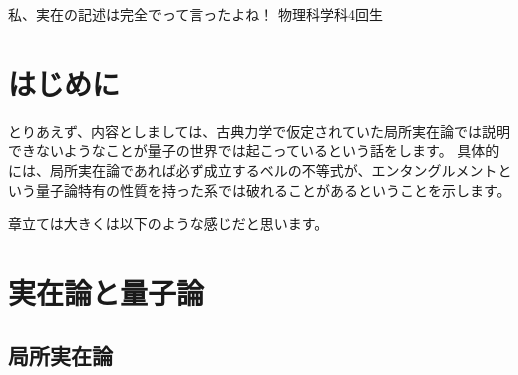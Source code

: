 \documentclass[10pt,b5paper,papersize,dvipdfmx]{jsbook}
\begin{document}

\newcommand\karizu[1]{\begin{center}（図：#1）\end{center}}
\renewcommand\textcolor[2]{#2}

\newif\ifsecI
\newif\ifsecII

\secItrue
\secIItrue


\kaishititle%
  {私、実在の記述は完全でって言ったよね！}%
  {物理科学科4回生}%
  {}%


\section*{はじめに}
とりあえず、内容としましては、古典力学で仮定されていた局所実在論では説明できないようなことが量子の世界では起こっているという話をします。
具体的には、局所実在論であれば必ず成立するベルの不等式が、エンタングルメントという量子論特有の性質を持った系では破れることがあるということを示します。\par
章立ては大きくは以下のような感じだと思います。


\ifsecI
\section{実在論と量子論}

%
\subsection{局所実在論} %
\end{document}
